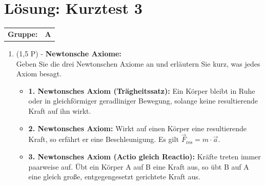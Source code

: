 \documentclass[11pt, a4paper]{article}
\begin{document}
\section*{\LARGE Lösung: Kurztest 3}
\noindent
\begin{tabular}{ll}
    \textbf{Gruppe: } & \LARGE\textbf{A}  \\[0.3cm]
\end{tabular}

\begin{enumerate}[label=\textbf{\arabic*.},itemsep=0.50cm]

    \item (1,5 P) - \textbf{Newtonsche Axiome:} \\
    Geben Sie die drei Newtonschen Axiome an und erläutern Sie kurz, was jedes Axiom besagt.
    \begin{solutionbox}
        \begin{itemize}[itemsep=0pt, topsep=0pt]
            \item \textbf{1. Newtonsches Axiom (Trägheitssatz):} Ein Körper bleibt in Ruhe oder in gleichförmiger geradliniger Bewegung, solange keine resultierende Kraft auf ihn wirkt.
            \item \textbf{2. Newtonsches Axiom:} Wirkt auf einen Körper eine resultierende Kraft, so erfährt er eine Beschleunigung. Es gilt $\vec{F}_{\mathrm{res}} = m \cdot \vec{a}$.
            \item \textbf{3. Newtonsches Axiom (Actio gleich Reactio):} Kräfte treten immer paarweise auf. Übt ein Körper A auf B eine Kraft aus, so übt B auf A eine gleich große, entgegengesetzt gerichtete Kraft aus.
        \end{itemize}
    \end{solutionbox}


\end{enumerate}
\end{document}
